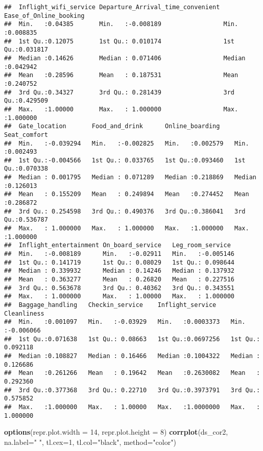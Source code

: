 \documentclass[
]{article}
\newenvironment{Shaded}{\begin{snugshade}}{\end{snugshade}}
\newcommand{\AttributeTok}[1]{\textcolor[rgb]{0.13,0.29,0.53}{#1}}
\newcommand{\DecValTok}[1]{\textcolor[rgb]{0.00,0.00,0.81}{#1}}
\newcommand{\FunctionTok}[1]{\textcolor[rgb]{0.13,0.29,0.53}{\textbf{#1}}}
\newcommand{\NormalTok}[1]{#1}
\newcommand{\StringTok}[1]{\textcolor[rgb]{0.31,0.60,0.02}{#1}}
\begin{document}
\begin{verbatim}
##  Inflight_wifi_service Departure_Arrival_time_convenient Ease_of_Online_booking
##  Min.   :0.04385       Min.   :-0.008189                 Min.   :0.008835      
##  1st Qu.:0.12075       1st Qu.: 0.010174                 1st Qu.:0.031817      
##  Median :0.14626       Median : 0.071406                 Median :0.042942      
##  Mean   :0.28596       Mean   : 0.187531                 Mean   :0.240752      
##  3rd Qu.:0.34327       3rd Qu.: 0.281439                 3rd Qu.:0.429509      
##  Max.   :1.00000       Max.   : 1.000000                 Max.   :1.000000      
##  Gate_location       Food_and_drink      Online_boarding     Seat_comfort     
##  Min.   :-0.039294   Min.   :-0.002825   Min.   :0.002579   Min.   :0.002493  
##  1st Qu.:-0.004566   1st Qu.: 0.033765   1st Qu.:0.093460   1st Qu.:0.070338  
##  Median : 0.001795   Median : 0.071289   Median :0.218869   Median :0.126013  
##  Mean   : 0.155209   Mean   : 0.249894   Mean   :0.274452   Mean   :0.286872  
##  3rd Qu.: 0.254598   3rd Qu.: 0.490376   3rd Qu.:0.386041   3rd Qu.:0.536787  
##  Max.   : 1.000000   Max.   : 1.000000   Max.   :1.000000   Max.   :1.000000  
##  Inflight_entertainment On_board_service   Leg_room_service   
##  Min.   :-0.008189      Min.   :-0.02911   Min.   :-0.005146  
##  1st Qu.: 0.141719      1st Qu.: 0.08029   1st Qu.: 0.098644  
##  Median : 0.339932      Median : 0.14246   Median : 0.137932  
##  Mean   : 0.363277      Mean   : 0.26820   Mean   : 0.227516  
##  3rd Qu.: 0.563678      3rd Qu.: 0.40362   3rd Qu.: 0.343551  
##  Max.   : 1.000000      Max.   : 1.00000   Max.   : 1.000000  
##  Baggage_handling   Checkin_service    Inflight_service     Cleanliness       
##  Min.   :0.001097   Min.   :-0.03929   Min.   :0.0003373   Min.   :-0.006066  
##  1st Qu.:0.071638   1st Qu.: 0.08663   1st Qu.:0.0697256   1st Qu.: 0.092118  
##  Median :0.108827   Median : 0.16466   Median :0.1004322   Median : 0.126686  
##  Mean   :0.261266   Mean   : 0.19642   Mean   :0.2630082   Mean   : 0.292360  
##  3rd Qu.:0.377368   3rd Qu.: 0.22710   3rd Qu.:0.3973791   3rd Qu.: 0.575852  
##  Max.   :1.000000   Max.   : 1.00000   Max.   :1.0000000   Max.   : 1.000000
\end{verbatim}

\begin{Shaded}
\begin{Highlighting}[]
\FunctionTok{options}\NormalTok{(}\AttributeTok{repr.plot.width =} \DecValTok{14}\NormalTok{, }\AttributeTok{repr.plot.height =} \DecValTok{8}\NormalTok{)}
\FunctionTok{corrplot}\NormalTok{(ds\_cor2, }\AttributeTok{na.label=}\StringTok{" "}\NormalTok{, }\AttributeTok{tl.cex=}\DecValTok{1}\NormalTok{, }\AttributeTok{tl.col=}\StringTok{"black"}\NormalTok{, }\AttributeTok{method=}\StringTok{"color"}\NormalTok{)}
\end{Highlighting}
\end{Shaded}
\end{document}
